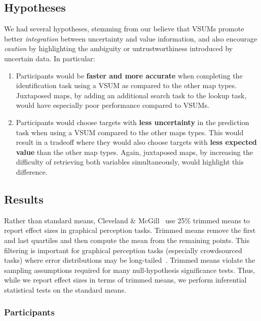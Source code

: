 \documentclass{vgtc}                          %
\begin{document}
\subsection{Hypotheses}

We had several hypotheses, stemming from our believe that VSUMs promote better \emph{integration} between uncertainty and value information, and also encourage \emph{caution} by highlighting the ambiguity or untrustworthiness introduced by uncertain data. In particular:
\begin{enumerate}
	\item Participants would be \textbf{faster and more accurate} when completing the identification task using a VSUM as compared to the other map types. Juxtaposed maps, by adding an additional search task to the lookup task, would have especially poor performance compared to VSUMs.
	\item Participants would choose targets with \textbf{less uncertainty} in the prediction task when using a VSUM compared to the other maps types. This would result in a tradeoff where they would also choose targets with \textbf{less expected value} than the other map types. Again, juxtaposed maps, by increasing the difficulty of retrieving both variables simultaneously, would highlight this difference.
\end{enumerate}

\subsection{Results}

Rather than standard means, Cleveland \& McGill~\cite{cleveland1984graphical} use 25\% trimmed means to report effect sizes in graphical perception tasks. Trimmed means remove the first and last quartiles and then compute the mean from the remaining points. This filtering is important for graphical perception tasks (especially crowdsourced tasks) where error distributions may be long-tailed~\cite{heer2010crowdsourcing}. Trimmed means violate the sampling assumptions required for many null-hypothesis significance tests. Thus, while we report effect sizes in terms of trimmed means, we perform inferential statistical tests on the standard means.

\subsubsection{Participants}
\end{document}
